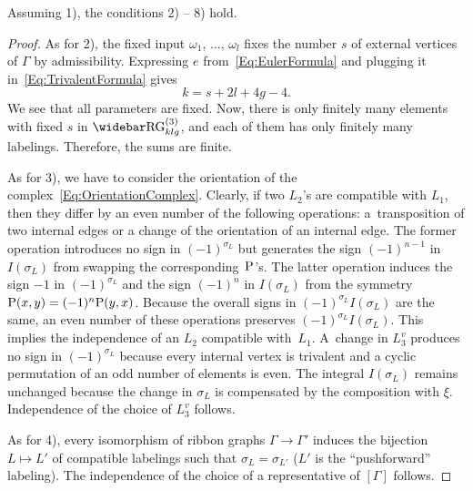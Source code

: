 \documentclass[\MainFolder/Text.tex]{subfiles}
\begin{document}
\begin{Lemma} \label{Lem:MCCond}
Assuming 1), the conditions 2) -- 8) hold.
\end{Lemma}
\begin{proof}

As for 2), the fixed input $\omega_1$, $\dotsc$, $\omega_l$ fixes the number $s$ of external vertices of $\Gamma$ by admissibility. Expressing $e$ from~\eqref{Eq:EulerFormula} and plugging it  in~\eqref{Eq:TrivalentFormula} gives
\begin{equation} \label{Eq:MCk}
k = s + 2 l + 4g - 4.
\end{equation}
We see that all parameters are fixed. Now, there is only finitely many elements with fixed $s$ in $\TRRG_{klg}$, and each of them has only finitely many labelings. Therefore, the sums are finite.

As for 3), we have to consider the orientation of the complex~\eqref{Eq:OrientationComplex}. Clearly, if two $L_2$'s are compatible with $L_1$, then they differ by an even number of the following operations: a~transposition of two internal edges or a change of the orientation of an internal edge. The former operation introduces no sign in $(-1)^{\sigma_L}$ but generates the sign $(-1)^{n-1}$ in $I(\sigma_L)$ from swapping the corresponding~$\mathrm{P}$'s. The latter operation induces the sign $-1$ in $(-1)^{\sigma_L}$ and the sign $(-1)^n$ in $I(\sigma_L)$ from the symmetry $\mathrm{P}(x,y) = (-1)^n \mathrm{P}(y,x)$. Because the overall signs in $(-1)^{\sigma_L} I(\sigma_L)$ are the same, an even number of these operations preserves $(-1)^{\sigma_L} I(\sigma_L)$. This implies the independence of an $L_2$ compatible with~$L_1$. A~change in $L_3^v$ produces no sign in $(-1)^{\sigma_L}$ because every internal vertex is trivalent and a cyclic permutation of an odd number of elements is even. The integral $I(\sigma_L)$ remains unchanged because the change in $\sigma_L$ is compensated by the composition with $\xi$. Independence of the choice of $L_3^v$ follows.

As for 4), every isomorphism of ribbon graphs $\Gamma \rightarrow \Gamma'$ induces the bijection $L\mapsto L'$ of compatible labelings such that $\sigma_L = \sigma_{L'}$ ($L'$ is the ``pushforward'' labeling). The independence of the choice of a representative of $[\Gamma]$ follows.


\end{proof}
\end{document}
